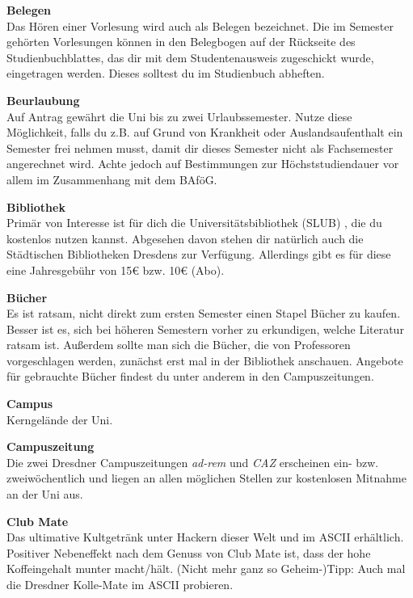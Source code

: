 \begin{multicols}{2}
\textbf{Belegen} \\
Das Hören einer Vorlesung wird auch als Belegen bezeichnet.
Die im Semester gehörten Vorlesungen können in den Belegbogen auf der Rückseite des Studienbuchblattes, das dir mit dem Studentenausweis zugeschickt wurde, eingetragen werden.
Dieses solltest du im Studienbuch abheften.

\textbf{Beurlaubung} \\
Auf Antrag gewährt die Uni bis zu zwei Urlaubssemester.
Nutze diese Möglichkeit, falls du z.B. auf Grund von Krankheit oder Auslandsaufenthalt ein Semester frei nehmen musst, damit dir dieses Semester nicht als Fachsemester angerechnet wird.
Achte jedoch auf Bestimmungen zur Höchststudiendauer vor allem im Zusammenhang mit dem BAföG.

\textbf{Bibliothek} \\
Primär von Interesse ist für dich die Universitätsbibliothek (SLUB) , die du kostenlos nutzen kannst.
Abgesehen davon stehen dir natürlich auch die Städtischen Bibliotheken Dresdens zur Verfügung.
Allerdings gibt es für diese eine Jahresgebühr von 15\euro{} bzw. 10\euro{} (Abo).

\textbf{Bücher} \\
Es ist ratsam, nicht direkt zum ersten Semester einen Stapel Bücher zu kaufen.
Besser ist es, sich bei höheren Semestern vorher zu erkundigen, welche Literatur ratsam ist.
Außerdem sollte man sich die Bücher, die von Professoren vorgeschlagen werden, zunächst erst mal in der Bibliothek anschauen.
Angebote für gebrauchte Bücher findest du unter anderem in den Campuszeitungen.

\textbf{Campus} \\
Kerngelände der Uni.

\textbf{Campuszeitung} \\
Die zwei Dresdner Campuszeitungen \textit{ad-rem}  und \textit{CAZ}  erscheinen ein- bzw. zweiwöchentlich und liegen an allen möglichen Stellen zur kostenlosen Mitnahme an der Uni aus.

\textbf{Club Mate} \\
Das ultimative Kultgetränk unter Hackern dieser Welt und im ASCII erhältlich.
Positiver Nebeneffekt nach dem Genuss von Club Mate ist, dass der hohe Koffeingehalt munter macht/hält.
(Nicht mehr ganz so Geheim-)Tipp:
Auch mal die Dresdner Kolle-Mate im ASCII probieren.


\end{multicols}
